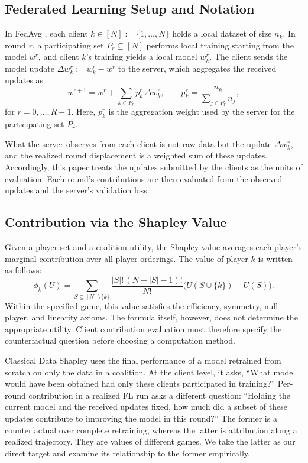 \documentclass[letterpaper]{article} %
\theoremstyle{definition} %
\begin{document}
\subsection{Federated Learning Setup and Notation}
\label{sec:fedavg}

In FedAvg \citep{mcmahan2016federated}, each client $k \in [N] := \{1,\dots,N\}$
holds a local dataset of size $n_k$. In round $r$, a participating set
$P_r \subseteq [N]$ performs local training starting from the model 
$w^r$, and client $k$'s training yields a local model $w_k^r$. The client sends
the model update $\Delta w_k^r := w_k^r - w^r$ to the server, which
aggregates the received updates as
\begin{equation}
\label{eq:fedavg}
w^{r+1}
= w^r + \sum_{k \in P_r} p_k^r\,\Delta w_k^r,
\qquad
p_k^r = \frac{n_k}{\sum_{j \in P_r} n_j},
\end{equation}
for $r=0,\dots,R-1$. Here, $p_k^r$ is the aggregation weight used by the server
for the participating set $P_r$.

What the server observes from each client is not raw data but the update
$\Delta w_k^r$, and the realized round displacement is a weighted
sum of these updates. Accordingly, this paper treats the updates submitted by the clients as the units of evaluation. Each round's contributions are then evaluated from the observed updates and the server's validation loss. 

\subsection{Contribution via the Shapley Value}
\label{sec:datashapley}

Given a player set and a coalition utility, the Shapley value averages each
player's marginal contribution over all player orderings. The value of
player $k$ is written as follows:
\begin{equation}
\label{eq:shapley}
\phi_k(U)
= \sum_{S \subseteq [N]\setminus\{k\}}
\frac{|S|!\,(N{-}|S|{-}1)!}{N!}
\bigl(U(S\cup\{k\})-U(S)\bigr).
\end{equation}
Within the specified game, this value satisfies the efficiency, symmetry,
null-player, and linearity axioms. The formula itself, however, does not
determine the appropriate utility. Client contribution evaluation must
therefore specify the counterfactual question before choosing a computation
method.

Classical Data Shapley uses the final performance of a model retrained from
scratch on only the data in a coalition. At the client level, it asks, ``What
model would have been obtained had only these clients participated in
training?'' Per-round contribution in a realized FL run asks a different
question: ``Holding the current model and the received updates fixed, how much
did a subset of these updates contribute to improving the model in this
round?'' The former is a counterfactual over complete retraining, whereas the
latter is attribution along a realized trajectory. They are values of
different games. We take the latter as our direct target and examine its
relationship to the former empirically.
\end{document}
